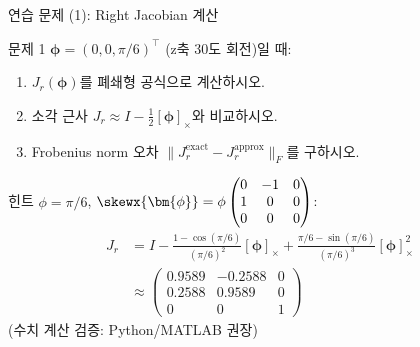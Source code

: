 \begin{frame}{연습 문제 (1): Right Jacobian 계산}
  \begin{block}{문제 1}
    $\bm{\phi} = (0, 0, \pi/6)^\top$ (z축 30도 회전)일 때:
    \begin{enumerate}
      \item $J_r(\bm{\phi})$를 폐쇄형 공식으로 계산하시오.
      \item 소각 근사 $J_r \approx I - \frac{1}{2}[\bm{\phi}]_\times$와 비교하시오.
      \item Frobenius norm 오차 $\|J_r^{\text{exact}} - J_r^{\text{approx}}\|_F$를 구하시오.
    \end{enumerate}
  \end{block}
  \pause
  \begin{exampleblock}{힌트}
    $\phi = \pi/6$, $\skewx{\bm{\phi}} = \phi\begin{pmatrix}0&-1&0\\1&0&0\\0&0&0\end{pmatrix}$:
    \begin{align*}
      J_r &= I - \frac{1-\cos(\pi/6)}{(\pi/6)^2}[\bm{\phi}]_\times + \frac{\pi/6-\sin(\pi/6)}{(\pi/6)^3}[\bm{\phi}]_\times^2 \\
      &\approx \begin{pmatrix}0.9589 & -0.2588 & 0 \\ 0.2588 & 0.9589 & 0 \\ 0 & 0 & 1\end{pmatrix}
    \end{align*}
    (수치 계산 검증: Python/MATLAB 권장)
  \end{exampleblock}
\end{frame}


